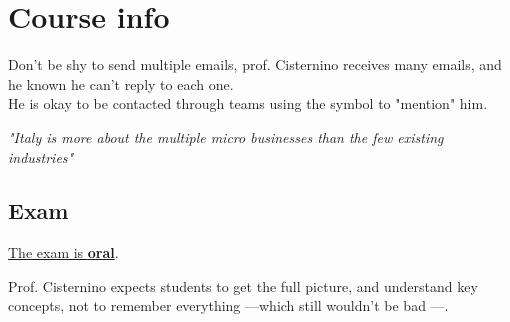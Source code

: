 \chapter*{Course info}

Don't be shy to send multiple emails, prof. Cisternino receives many emails, and he known he can't reply to each one.\\
He is okay to be contacted through teams using the \textbf{\@} symbol to "mention" him.

\begin{center}
   \textit{"Italy is more about the multiple micro businesses than the few existing industries"}
\end{center}


\section*{Exam}

\ul{The exam is \textbf{oral}}.

Prof. Cisternino expects students to get the full picture, and understand key concepts, not to remember everything ---which still wouldn't be bad \smiley---.
